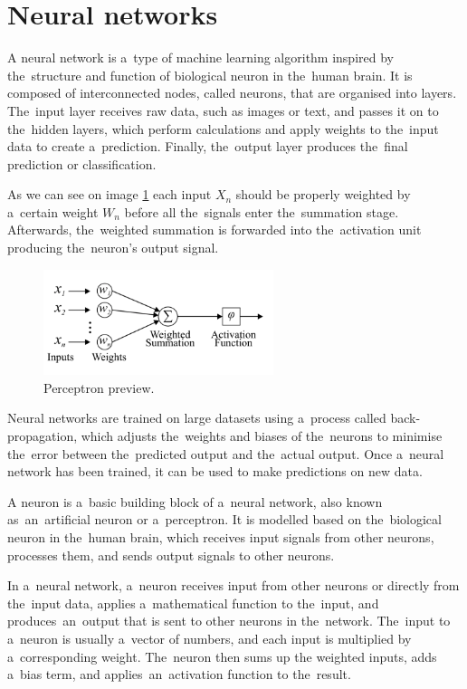     \section{Neural networks} \label{sec:nn}
    A neural network is a~type of machine learning algorithm inspired by the~structure and function of biological neuron in the~human brain. It is composed of interconnected nodes, called neurons, that are organised into layers. The~input layer receives raw data, such as images or text, and passes it on to the~hidden layers, which perform calculations and apply weights to the~input data to create a~prediction. Finally, the~output layer produces the~final prediction or classification.
    
    As we can see on image \ref{fig:perceptron} each input $X_n$ should be properly weighted by a~certain weight $W_n$ before all the~signals enter the~summation stage. Afterwards, the~weighted summation is forwarded into the~activation unit producing the~neuron’s output signal.
    \begin{center}
        \begin{figure}[!ht]
            \centering
            \includegraphics[width=0.6\textwidth]{figures/nn}
            \caption{Perceptron preview. \cite{Mourgias-Alexandris:19}}
            \label{fig:perceptron}
        \end{figure}
    \end{center}
    Neural networks are trained on large datasets using a~process called back-propagation, which adjusts the~weights and biases of the~neurons to minimise the~error between the~predicted output and the~actual output. Once a~neural network has been trained, it can be used to make predictions on new data.
    
    A neuron is a~basic building block of a~neural network, also known as~an~artificial neuron or a~perceptron.
It is modelled based on the~biological neuron in the~human brain, which receives input signals from other neurons,
processes them, and sends output signals to other neurons.

    In a~neural network, a~neuron receives input from other neurons or directly from the~input data, applies a~mathematical function to the~input, and produces~an~output that is sent to other neurons in the~network. The~input to a~neuron is usually a~vector of numbers, and each input is multiplied by a~corresponding weight. The~neuron then sums up the weighted inputs, adds a~bias term, and applies~an~activation function to the~result.

